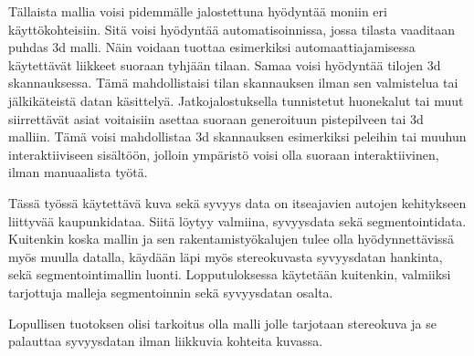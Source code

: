 Tällaista mallia voisi pidemmälle jalostettuna hyödyntää moniin eri käyttökohteisiin.
Sitä voisi hyödyntää automatisoinnissa, jossa tilasta vaaditaan puhdas 3d malli.
Näin voidaan tuottaa esimerkiksi automaattiajamisessa käytettävät liikkeet suoraan tyhjään tilaan.
Samaa voisi hyödyntää tilojen 3d skannauksessa.
Tämä mahdollistaisi tilan skannauksen ilman sen valmistelua tai jälkikäteistä datan käsittelyä. 
Jatkojalostuksella tunnistetut huonekalut tai muut siirrettävät asiat voitaisiin asettaa suoraan generoituun pistepilveen tai 3d malliin.
Tämä voisi mahdollistaa 3d skannauksen esimerkiksi peleihin tai muuhun interaktiiviseen sisältöön,
jolloin ympäristö voisi olla suoraan interaktiivinen, ilman manuaalista työtä. 

Tässä työssä käytettävä kuva sekä syvyys data on itseajavien autojen kehitykseen liittyvää kaupunkidataa. 
Siitä löytyy valmiina, syvyysdata sekä segmentointidata.
Kuitenkin koska mallin ja sen rakentamistyökalujen tulee olla hyödynnettävissä myös muulla datalla,
käydään läpi myös stereokuvasta syvyysdatan hankinta,
sekä segmentointimallin luonti. Lopputuloksessa käytetään kuitenkin,
valmiiksi tarjottuja malleja segmentoinnin sekä syvyysdatan osalta.

Lopullisen tuotoksen olisi tarkoitus olla malli jolle tarjotaan stereokuva ja se palauttaa syvyysdatan ilman liikkuvia kohteita kuvassa.
